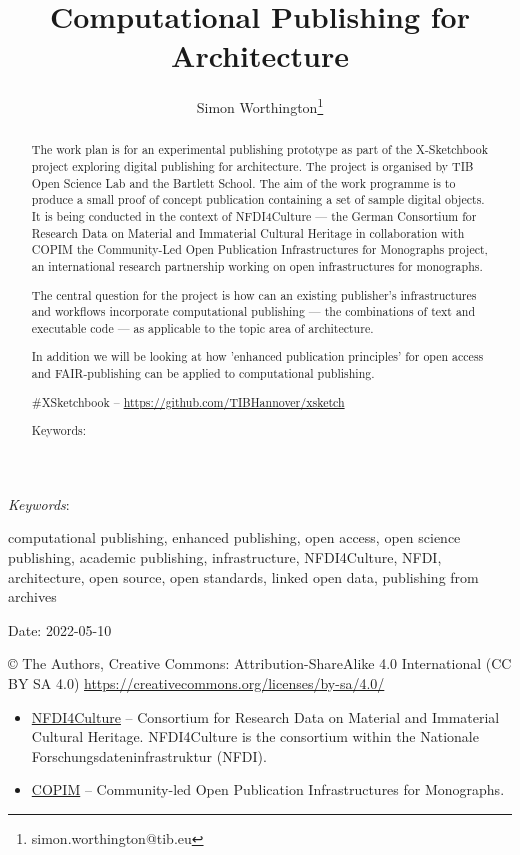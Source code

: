 \documentclass{article}
\author{Simon Worthington\thanks{simon.worthington@tib.eu}}
\affil{NextGen Books – making the future book, TIB }
\newcommand{\subtitle}[1]{%
                    
	\posttitle{%
                        
		\par\end{center}
                        
		\begin{center}\large#1\end{center}
                        
		\vskip 0.5em}%
                }
\def\keywords{\vspace{.5em}
                
{\textit{Keywords}:\,\relax%
                
}}
\newcommand{\sep}{, }
\begin{document}
\title{Computational Publishing for Architecture}
\subtitle{ — An X-Sketchbook Research Work Plan}

\maketitle

\begin{abstract}


The work plan is for an experimental publishing prototype as part of the X-Sketchbook project exploring digital publishing for architecture. The project is organised by TIB Open Science Lab and the Bartlett School. The aim of the work programme is to produce a small proof of concept publication containing a set of sample digital objects. It is being conducted in the context of NFDI4Culture — the German Consortium for Research Data on Material and Immaterial Cultural Heritage in collaboration with COPIM the Community-Led Open Publication Infrastructures for Monographs project, an international research partnership working on open infrastructures for monographs.


The central question for the project is how can an existing publisher's infrastructures and workflows incorporate computational publishing — the combinations of text and executable code — as applicable to the topic area of architecture. 


In addition we will be looking at how 'enhanced publication principles' for open access and FAIR‑publishing can be applied to  computational publishing. 


\#XSketchbook – \href{https://github.com/TIBHannover/xsketch}{https://github.com/TIBHannover/xsketch}


Keywords:

\end{abstract}

\keywords{computational publishing\sep enhanced publishing\sep open access\sep open science publishing\sep academic publishing\sep infrastructure\sep NFDI4Culture\sep NFDI\sep architecture\sep open source\sep open standards\sep linked open data\sep publishing from archives}

Date: 2022-05-10 


© The Authors, Creative Commons: Attribution-ShareAlike 4.0 International (CC BY SA 4.0) \href{https://creativecommons.org/licenses/by-sa/4.0/}{https://creativecommons.org/licenses/by-sa/4.0/} 

\begin{itemize}
\item \href{https://nfdi4culture.de/}{NFDI4Culture} – Consortium for Research Data on Material and Immaterial Cultural Heritage. NFDI4Culture is the consortium within the Nationale Forschungsdaten­infrastruktur (NFDI).


\item \href{https://www.copim.ac.uk/}{COPIM} – Community-led Open Publication Infrastructures for Monographs.


\end{itemize}
\end{document}
